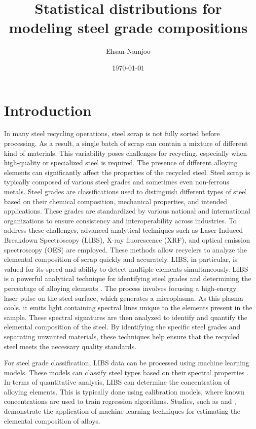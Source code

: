 \documentclass[12pt,a4paper]{article}
\title{Statistical distributions for modeling steel grade compositions  }
\author{Ehsan Namjoo}
\date{\today}
\begin{document}
	
	\maketitle
	\tableofcontents
	\newpage
	
	\section{Introduction} \label{h:intro}
	In many steel recycling operations, steel scrap is not fully sorted before processing. As a result, a single batch of scrap can contain a mixture of different kind of materials. This variability poses challenges for recycling, especially when high-quality or specialized steel is required. The presence of different alloying elements can significantly affect the properties of the recycled steel. Steel scrap is typically composed of various steel grades and sometimes even non-ferrous metals. Steel grades are classifications used to distinguish different types of steel based on their chemical composition, mechanical properties, and intended applications. These grades are standardized by various national and international organizations to ensure consistency and interoperability across industries.
	To address these challenges, advanced analytical techniques such as Laser-Induced Breakdown Spectroscopy (LIBS), X-ray fluorescence (XRF), and optical emission spectroscopy (OES) are employed. These methods allow recyclers to analyze the elemental composition of scrap quickly and accurately. LIBS, in particular, is valued for its speed and ability to detect multiple elements simultaneously. 
	LIBS is a powerful analytical technique for identifying steel grades and determining the percentage of alloying elements \cite{Legnaioli_LIBS_Metals_2014}. The process involves focusing a high-energy laser pulse on the steel surface, which generates a microplasma. As this plasma cools, it emits light containing spectral lines unique to the elements present in the sample. These spectral signatures are then analyzed to identify and quantify the elemental composition of the steel.
	By identifying the specific steel grades and separating unwanted materials, these techniques help ensure that the recycled steel meets the necessary quality standards. 

 
 
	For steel grade classification, LIBS data can be processed using machine learning models. These models can classify steel types based on their spectral properties \cite{Lin2024}. 	In terms of quantitative analysis, LIBS can determine the concentration of alloying elements. This is typically done using calibration models, where known concentrations are used to train regression algorithms. Studies, such as  \cite{Traparic2023} and  \cite{Jiang2020}, demonstrate the application of machine learning techniques for estimating the elemental composition of alloys.
	
\end{document}
